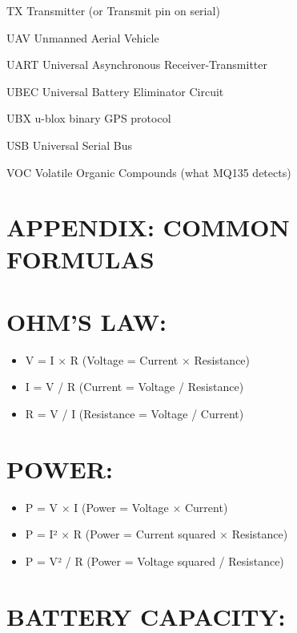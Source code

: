 \documentclass[11pt,letterpaper]{article}
\begin{document}
TX      Transmitter (or Transmit pin on serial)\par

UAV     Unmanned Aerial Vehicle\par

UART    Universal Asynchronous Receiver-Transmitter\par

UBEC    Universal Battery Eliminator Circuit\par

UBX     u-blox binary GPS protocol\par

USB     Universal Serial Bus\par

VOC     Volatile Organic Compounds (what MQ135 detects)\par

\section{APPENDIX: COMMON FORMULAS}

\section{OHM'S LAW:}

\begin{itemize}
  \item V = I $\times$ R    (Voltage = Current $\times$ Resistance)
  \item I = V / R    (Current = Voltage / Resistance)
  \item R = V / I    (Resistance = Voltage / Current)
\end{itemize}

\section{POWER:}

\begin{itemize}
  \item P = V $\times$ I         (Power = Voltage $\times$ Current)
  \item P = I² $\times$ R        (Power = Current squared $\times$ Resistance)
  \item P = V² / R        (Power = Voltage squared / Resistance)
\end{itemize}

\section{BATTERY CAPACITY:}
\end{document}
